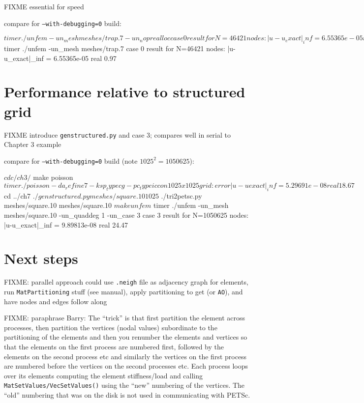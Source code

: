 FIXME essential for speed

compare for \texttt{--with-debugging=0} build:
\begin{cline}
$ timer ./unfem -un_mesh meshes/trap.7 -un_noprealloc
case 0 result for N=46421 nodes:  |u-u_exact|_inf = 6.55365e-05
real 56.30
$ timer ./unfem -un_mesh meshes/trap.7
case 0 result for N=46421 nodes:  |u-u_exact|_inf = 6.55365e-05
real 0.97
\end{cline}

\section{Performance relative to \pDMDA structured grid}

FIXME introduce \texttt{genstructured.py} and case 3; compares well in serial to Chapter 3 example

compare for \texttt{--with-debugging=0} build (note $1025^2=1050625$):
\begin{cline}
$ cd c/ch3/
$ make poisson
$ timer ./poisson -da_refine 7 -ksp_type cg -pc_type icc
on 1025 x 1025 grid:  error |u-uexact|_inf = 5.29691e-08
real 18.67
$ cd ../ch7
$ ./genstructured.py meshes/square.10 1025
$ ./tri2petsc.py meshes/square.10 meshes/square.10
$ make unfem
$ timer ./unfem -un_mesh meshes/square.10 -un_quaddeg 1 -un_case 3
case 3 result for N=1050625 nodes:  |u-u_exact|_inf = 9.89813e-08
real 24.47
\end{cline}

\section{Next steps}

FIXME: parallel approach could use \Triangle \texttt{.neigh} file as adjacency graph for elements, run \texttt{MatPartitioning} stuff (see manual), apply partitioning to get \pIS (or \texttt{AO}), and have nodes and edges follow along

FIXME: paraphrase Barry: The ``trick'' is that first partition the element across processes, then partition the vertices (nodal values) subordinate to the partitioning of the elements and then you renumber the elements and vertices so that the elements on the first process are numbered first, followed by the elements on the second process etc and similarly the vertices on the first process are numbered before the vertices on the second processes etc.  Each process loops over its elements computing the element stiffness/load and calling \texttt{MatSetValues/VecSetValues()} using the ``new'' numbering of the vertices.  The ``old'' numbering that was on the disk is not used in communicating with PETSc.

